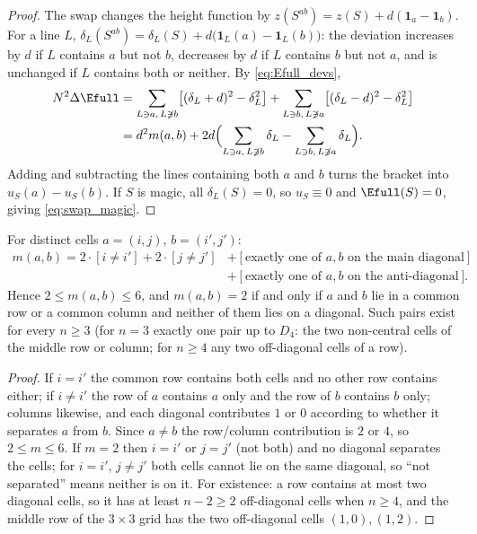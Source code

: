\begin{proof}
The swap changes the height function by $z(S^{ab})=z(S)+d(\mathbf 1_a-\mathbf 1_b)$.  For a line $L$,
$\delta_L(S^{ab})=\delta_L(S)+d\bigl(\mathbf 1_L(a)-\mathbf 1_L(b)\bigr)$: the deviation increases by $d$ if $L$
contains $a$ but not $b$, decreases by $d$ if $L$ contains $b$ but not $a$, and is unchanged if $L$ contains both
or neither.  By \eqref{eq:Efull_devs},
\begin{align*}
N^{2}\Delta \Efull&=\sum_{L\ni a,\,L\not\ni b}\bigl[(\delta_L+d)^{2}-\delta_L^{2}\bigr]
+\sum_{L\ni b,\,L\not\ni a}\bigl[(\delta_L-d)^{2}-\delta_L^{2}\bigr]\\
&=d^{2}m(a,b)+2d\Bigl(\sum_{L\ni a,\,L\not\ni b}\delta_L-\sum_{L\ni b,\,L\not\ni a}\delta_L\Bigr).
\end{align*}
Adding and subtracting the lines containing both $a$ and $b$ turns the bracket into $u_S(a)-u_S(b)$.
If $S$ is magic, all $\delta_L(S)=0$, so $u_S\equiv0$ and $\Efull(S)=0$, giving \eqref{eq:swap_magic}.
\end{proof}

\begin{lemma}
\label{lem:m_values}
For distinct cells $a=(i,j)$, $b=(i',j')$:
\begin{align*}
m(a,b)=2\cdot[i\ne i']+2\cdot[j\ne j']&+[\text{exactly one of }a,b\text{ on the main diagonal}]\\
&+[\text{exactly one of }a,b\text{ on the anti-diagonal}].
\end{align*}
Hence $2\le m(a,b)\le6$, and $m(a,b)=2$ if and only if $a$ and $b$ lie in a common row or a common column and
neither of them lies on a diagonal.  Such pairs exist for every $n\ge3$ (for $n=3$ exactly one pair up to $D_4$:
the two non-central cells of the middle row or column; for $n\ge4$ any two off-diagonal cells of a row).
\end{lemma}

\begin{proof}
If $i=i'$ the common row contains both cells and no other row contains either; if $i\ne i'$ the row of $a$ contains $a$ only
and the row of $b$ contains $b$ only; columns likewise, and each diagonal contributes $1$ or $0$ according to whether it
separates $a$ from $b$.  Since $a\ne b$ the row/column contribution is $2$ or $4$, so $2\le m\le 6$.  If $m=2$ then $i=i'$ or
$j=j'$ (not both) and no diagonal separates the cells; for $i=i'$, $j\ne j'$ both cells cannot lie on the same diagonal, so
``not separated'' means neither is on it.  For existence: a row contains at most two diagonal cells, so it has at least
$n-2\ge2$ off-diagonal cells when $n\ge4$, and the middle row of the $3\times3$ grid has the two off-diagonal cells $(1,0),(1,2)$.
\end{proof}

